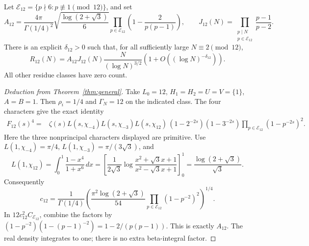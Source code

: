 \begin{theorem}\label{thm:c12}
Let \(\mathcal E_{12}=\{p\nmid6:p\not\equiv1\pmod{12}\}\), and set
\[
 A_{12}=\frac{4\pi}{\Gamma(1/4)^2}
       \sqrt{\frac{\log(2+\sqrt3)}{6}}
       \prod_{p\in\mathcal E_{12}}
                        \left(1-\frac{2}{p(p-1)}\right),\qquad
 J_{12}(N)=\prod_{\substack{p\mid N\\p\in\mathcal E_{12}}}
                                      \frac{p-1}{p-2}.
\]
There is an explicit \(\delta_{12}>0\) such that, for all sufficiently
large \(N\equiv2\pmod{12}\),
\[
 R_{12}(N)=A_{12}J_{12}(N)\frac{N}{(\log N)^{3/2}}
                 \left(1+O((\log N)^{-\delta_{12}})\right).
\]
All other residue classes have zero count.
\end{theorem}
\begin{proof}[Deduction from Theorem~\ref{thm:general}]
Take \(L_0=12\), \(H_1=H_2=U=V=\{1\}\), \(A=B=1\).
Then \(\rho_i=1/4\) and \(\Gamma_N=12\) on the indicated class.
The four characters give the exact identity
\begin{align*}
 F_{12}(s)^4={}&\zeta(s)L(s,\chi_{-4})L(s,\chi_{-3})L(s,\chi_{12})\,
        (1-2^{-2s})(1-3^{-2s})
        \prod_{p\in\mathcal E_{12}}(1-p^{-2s})^2.
\end{align*}
Here the three nonprincipal characters displayed are primitive.
Use \(L(1,\chi_{-4})=\pi/4\),
\(L(1,\chi_{-3})=\pi/(3\sqrt3)\), and
\[
 L(1,\chi_{12})=\int_0^1\frac{1-x^4}{1+x^6}\,dx
 =\left[\frac{1}{2\sqrt3}
 \log\frac{x^2+\sqrt3x+1}{x^2-\sqrt3x+1}\right]_0^1
 =\frac{\log(2+\sqrt3)}{\sqrt3}.
\]
Consequently
\[
 c_{12}=\frac{1}{\Gamma(1/4)}
 \left(\frac{\pi^2\log(2+\sqrt3)}{54}
       \prod_{p\in\mathcal E_{12}}(1-p^{-2})^2\right)^{1/4}.
\]
In \(12c_{12}^2C_{\mathcal E_{12}}\), combine the factors by
\((1-p^{-2})(1-(p-1)^{-2})=1-2/(p(p-1))\).
This is exactly \(A_{12}\). The real density integrates to one;
there is no extra beta-integral factor.
\end{proof}


